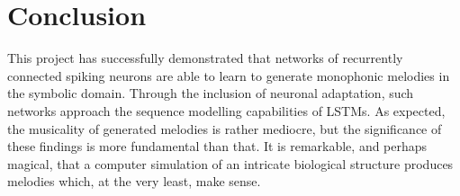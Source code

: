\documentclass[../../report.tex]{subfiles}
\begin{document}
\chapter{Conclusion}

This project has successfully demonstrated that networks of recurrently connected
spiking neurons are able to learn to generate monophonic melodies in the
symbolic domain. Through the inclusion of neuronal adaptation, such networks
approach the sequence modelling capabilities of LSTMs. As expected, the
musicality of generated melodies is rather mediocre, but the significance of
these findings is more fundamental than that. It is remarkable, and perhaps
magical, that a computer simulation of an intricate biological structure
produces melodies which, at the very least, make sense.


\end{document}
